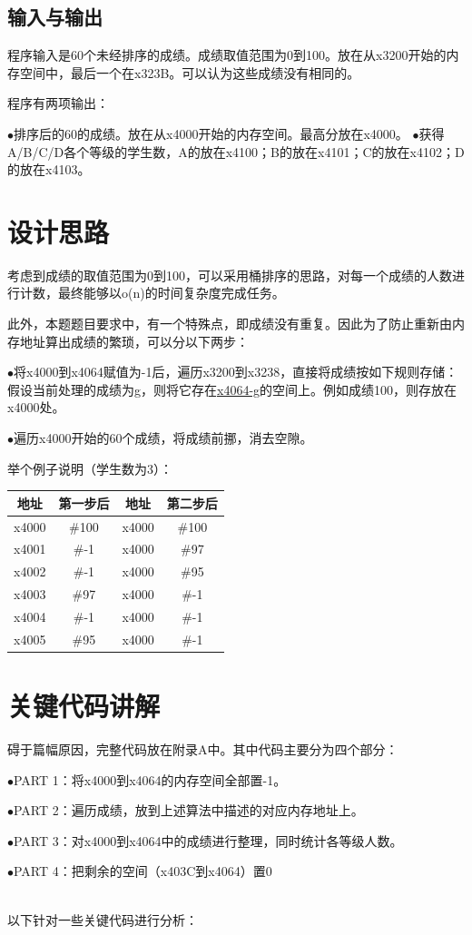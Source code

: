 \documentclass[UTF8]{article}
\begin{document}
	\subsection{输入与输出}
	程序输入是60个未经排序的成绩。成绩取值范围为0到100。放在从x3200开始的内存空间中，最后一个在x323B。可以认为这些成绩没有相同的。\par
	程序有两项输出：\par
	$\bullet$排序后的60的成绩。放在从x4000开始的内存空间。最高分放在x4000。
	$\bullet$获得A/B/C/D各个等级的学生数，A的放在x4100；B的放在x4101；C的放在x4102；D的放在x4103。

	\section{设计思路}
	考虑到成绩的取值范围为0到100，可以采用桶排序的思路，对每一个成绩的人数进行计数，最终能够以o(n)的时间复杂度完成任务。\par
	此外，本题题目要求中，有一个特殊点，即成绩没有重复。因此为了防止重新由内存地址算出成绩的繁琐，可以分以下两步：\par
	$\bullet$将x4000到x4064赋值为-1后，遍历x3200到x3238，直接将成绩按如下规则存储：假设当前处理的成绩为g，则将它存在\underline{x4064-g}的空间上。例如成绩100，则存放在x4000处。\par
	$\bullet$遍历x4000开始的60个成绩，将成绩前挪，消去空隙。\par
	举个例子说明（学生数为3）：\par
	\begin{tabular}{|c|c|c|c|}
		\hline
		地址 & 第一步后 & 地址 & 第二步后\\
		\hline 
		x4000 & \#100 & x4000 & \#100 \\ 
		\hline 
		x4001 & \#-1 & x4000 & \#97 \\ 
		\hline 
		x4002 & \#-1 & x4000 & \#95 \\ 
		\hline 
		x4003 & \#97 & x4000 & \#-1 \\ 
		\hline 
		x4004 & \#-1 & x4000 & \#-1 \\ 
		\hline 
		x4005 & \#95 & x4000 & \#-1 \\ 
		\hline 
	\end{tabular} 
	
	\section{关键代码讲解}
	碍于篇幅原因，完整代码放在附录A中。其中代码主要分为四个部分：\par
	$\bullet$PART 1：将x4000到x4064的内存空间全部置-1。\par
	$\bullet$PART 2：遍历成绩，放到上述算法中描述的对应内存地址上。\par
	$\bullet$PART 3：对x4000到x4064中的成绩进行整理，同时统计各等级人数。\par
	$\bullet$PART 4：把剩余的空间（x403C到x4064）置0\par
	\hspace*{\fill} \\
	以下针对一些关键代码进行分析：\par
\end{document}
